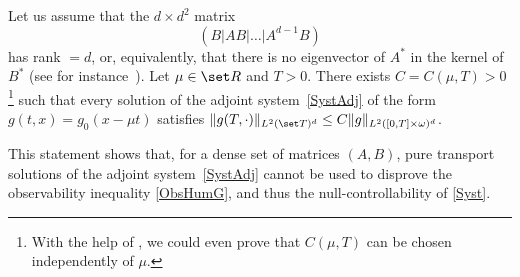 \begin{prop}\label{th:transport?}
Let us assume that the $d\times d^2$ matrix
\begin{equation*}
(B | AB | \dots | A^{d-1} B)
\end{equation*}
has rank $=d$, or, equivalently, that there is no eigenvector of $A^*$ in the kernel of $B^*$ (see for instance~\cite[Lem.\,1]{beauchard_2011}).
Let $\mu\in \set R$ and $T>0$. There exists $C=C(\mu,T)>0$\footnote{With the help of , we could even prove that $C(\mu,T)$ can be chosen independently of $\mu$.} such that every solution of the adjoint system~\eqref{SystAdj} of the form $g(t,x) = g_0(x-\mu t)$ satisfies $\|g(T,\cdot)\|_{L^2(\set T)^d}\leq C \|g\|_{L^2([0,T]\times\omega)^d}$.
\end{prop}

This statement shows that, for a dense set of matrices $(A,B)$, pure transport solutions of the adjoint system~\eqref{SystAdj} cannot be used to disprove the observability inequality \eqref{ObsHumG}, and thus the null-controllability of \eqref{Syst}.

